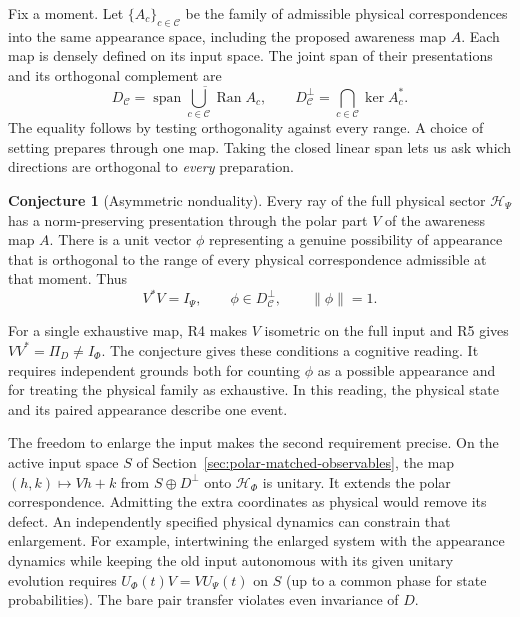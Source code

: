 \documentclass[11pt]{article}
\theoremstyle{definition}
\newtheorem{conjecture}[proposition]{Conjecture}
\DeclareMathOperator{\Ran}{Ran}
\DeclareMathOperator{\Span}{span}
\begin{document}
Fix a moment. Let $\{A_c\}_{c\in\mathcal C}$ be the family of admissible physical correspondences into the same appearance space, including the proposed awareness map $A$. Each map is densely defined on its input space. The joint span of their presentations and its orthogonal complement are
\begin{equation}
 D_{\mathcal C}=\overline{\Span\!\bigcup_{c\in\mathcal C}\Ran A_c},
 \qquad D_{\mathcal C}^{\perp}=\bigcap_{c\in\mathcal C}\ker A_c^* .
 \label{eq:joint-presentation-space}
\end{equation}
The equality follows by testing orthogonality against every range. A choice of setting prepares through one map. Taking the closed linear span lets us ask which directions are orthogonal to \emph{every} preparation.

\begin{conjecture}[Asymmetric nonduality]\label{conj:asymmetric-nonduality}
Every ray of the full physical sector $\mathcal H_\Psi$ has a norm-preserving presentation through the polar part $V$ of the awareness map $A$. There is a unit vector $\phi$ representing a genuine possibility of appearance that is orthogonal to the range of every physical correspondence admissible at that moment. Thus
\[
 V^*V=I_\Psi,\qquad \phi\in D_{\mathcal C}^{\perp},\qquad \|\phi\|=1 .
\]
\end{conjecture}
For a single exhaustive map, R4 makes $V$ isometric on the full input and R5 gives $VV^*=\Pi_D\ne I_\Phi$. The conjecture gives these conditions a cognitive reading. It requires independent grounds both for counting $\phi$ as a possible appearance and for treating the physical family as exhaustive. In this reading, the physical state and its paired appearance describe one event.

The freedom to enlarge the input makes the second requirement precise. On the active input space $S$ of Section~\ref{sec:polar-matched-observables}, the map $(h,k)\mapsto Vh+k$ from $S\oplus D^\perp$ onto $\mathcal H_\Phi$ is unitary. It extends the polar correspondence. Admitting the extra coordinates as physical would remove its defect. An independently specified physical dynamics can constrain that enlargement. For example, intertwining the enlarged system with the appearance dynamics while keeping the old input autonomous with its given unitary evolution requires $U_\Phi(t)V=VU_\Psi(t)$ on $S$ (up to a common phase for state probabilities). The bare pair transfer violates even invariance of $D$.
\end{document}
